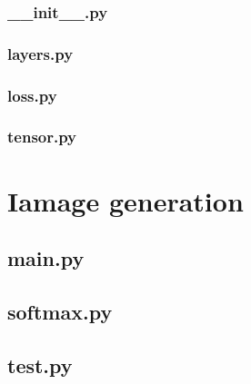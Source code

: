 \documentclass[12pt]{article}
\newcommand{\incNN}[2]{\label{NN:#2}\newpage}
\newcommand{\incTex}[2]{\label{tex:#2}\newpage}
\begin{document}
\subsubsection{\_\_init\_\_.py}											\incNN{python}{pynet/__init__.py}
\subsubsection{layers.py}												\incNN{python}{pynet/layers.py}
\subsubsection{loss.py}													\incNN{python}{pynet/loss.py}
\subsubsection{tensor.py}												\incNN{python}{pynet/tensor.py}

\section{Iamage generation}
\subsection{main.py}													\incTex{python}{main.py}
\subsection{softmax.py}												\incTex{python}{softmax.py}
\subsection{test.py}													\incTex{python}{test.py}
\end{document}
